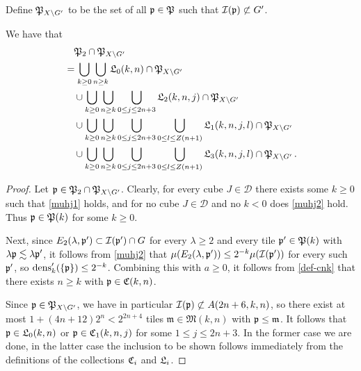 {Define ${\mathfrak P}_{X \setminus G'}$ to be the set of all ${\mathfrak p} \in {\mathfrak P}$ such that ${\mathcal{I}}({\mathfrak p}) \not \subset G'$.
\begin{lemma}
\label{antichain-decomposition}
    We have that
    \begin{align}
        \label{eq-fp'-decomposition}
        &\quad {\mathfrak P}_2 \cap {\mathfrak P}_{X \setminus G'}\\
        &=  \bigcup_{k \ge 0} \bigcup_{n \ge k} {\mathfrak L}_0(k,n) \cap {\mathfrak P}_{X \setminus G'} \\
        &\quad\cup \bigcup_{k \ge 0} \bigcup_{n \ge k}\bigcup_{0 \le j \le 2n+3} {\mathfrak L}_2(k,n,j) \cap {\mathfrak P}_{X \setminus G'}\\
        &\quad\cup  \bigcup_{k \ge 0} \bigcup_{n \ge k}\bigcup_{0 \le j \le 2n+3} \bigcup_{0 \le l \le Z(n+1)} {\mathfrak L}_1(k,n,j,l) \cap {\mathfrak P}_{X \setminus G'}\\
        &\quad\cup  \bigcup_{k \ge 0} \bigcup_{n \ge k}\bigcup_{0 \le j \le 2n+3} \bigcup_{0 \le l \le Z(n+1)}  {\mathfrak L}_3(k,n,j,l)\cap {\mathfrak P}_{X \setminus G'}\,.
    \end{align}
\end{lemma}

\begin{proof}
    Let ${\mathfrak p} \in {\mathfrak P}_2 \cap {\mathfrak P}_{X \setminus G'}$. Clearly, for every cube $J \in \mathcal{D}$ there exists some $k \ge 0$ such that \eqref{muhj1} holds, and for no cube $J \in \mathcal{D}$ and no $k < 0$ does \eqref{muhj2} hold. Thus ${\mathfrak p} \in {\mathfrak P}(k)$ for some $k \ge 0$.

    Next, since $E_2(\lambda, {\mathfrak p}') \subset {\mathcal{I}}({\mathfrak p}')\cap G$ for every $\lambda \ge 2$ and every tile ${\mathfrak p}' \in {\mathfrak P}(k)$ with $\lambda{\mathfrak p} \lesssim \lambda {\mathfrak p}'$, it follows from \eqref{muhj2} that $\mu(E_2(\lambda, {\mathfrak p}')) \le 2^{-k} \mu({\mathcal{I}}({\mathfrak p}'))$ for every such ${\mathfrak p}'$, so $\operatorname{\operatorname{dens}}_k'(\{{\mathfrak p}\}) \le 2^{-k}$. Combining this with $a \ge 0$, it follows from \eqref{def-cnk} that there exists $n\ge k$ with ${\mathfrak p} \in {\mathfrak C}(k,n)$.

    Since ${\mathfrak p} \in {\mathfrak P}_{X \setminus G'}$, we have in particular ${\mathcal{I}}({\mathfrak p}) \not \subset A(2n + 6, k, n)$, so there exist at most $1 + (4n + 12)2^n < 2^{2n+4}$ tiles $\mathfrak{m} \in \mathfrak{M}(k,n)$ with ${\mathfrak p} \le \mathfrak{m}$. It follows that ${\mathfrak p} \in {\mathfrak L}_0(k,n)$ or ${\mathfrak p} \in {\mathfrak C}_1(k,n,j)$ for some $1 \le j \le 2n + 3$. In the former case we are done, in the latter case the inclusion to be shown follows immediately from the definitions of the collections ${\mathfrak C}_i$ and ${\mathfrak L}_i$.
\end{proof}

}
